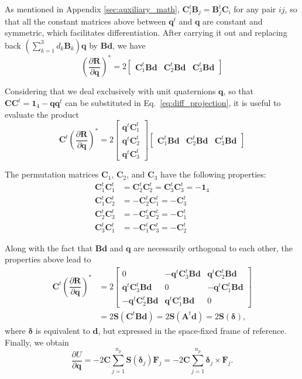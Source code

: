 \documentclass[aip,jcp,reprint,amsmath,amssymb,raggedbottom]{revtex4-1}
\newcommand{\mt}[1]{\boldsymbol{\mathbf{#1}}}           %
\newcommand{\vt}[1]{\boldsymbol{\mathbf{#1}}}           %
\newcommand{\tr}[1]{#1^t}                               %
\newcommand{\diff}[2]{\dfrac{\partial #1}{\partial #2}} %
\begin{document}
As mentioned in Appendix \ref{sec:auxiliary_math}, $\tr{\mt C}_i \mt B_j = \tr{\mt B}_j \mt C_i$ for any pair $ij$, so that all the constant matrices above between $\tr{\vt q}$ and $\vt q$ are constant and symmetric, which facilitates differentiation. After carrying it out and replacing back $(\sum_{k=1}^3 d_k \mt B_k) \vt q$ by $\mt B \vt d$, we have
\[
\left( \diff{\vt R}{\vt q} \right)^\ast = 2 \left[\begin{array}{ccc}
\tr{\mt C}_1 \mt B \vt d & \tr{\mt C}_2 \mt B \vt d & \tr{\mt C}_3 \mt B \vt d
\end{array}\right]
\]

Considering that we deal exclusively with unit quaternions $\vt q$, so that $\mt C \tr{\mt C} = \mt 1_4 - \vt q \tr{\vt q}$ can be substituted in Eq.~\ref{eq:diff_projection}, it is useful to evaluate the product
\[
\tr{\mt C} \left( \diff{\vt R}{\vt q} \right)^\ast = 2 \left[\begin{array}{c}
\tr{\vt q}\tr{\mt C_1} \\
\tr{\vt q}\tr{\mt C_2} \\
\tr{\vt q}\tr{\mt C_3}
\end{array}\right] \left[\begin{array}{ccc}
\tr{\mt C}_1 \mt B \vt d & \tr{\mt C}_2 \mt B \vt d & \tr{\mt C}_3 \mt B \vt d
\end{array}\right]
\]

The permutation matrices $\mt C_1$, $\mt C_2$, and $\mt C_3$ have the following properties:
\begin{equation}
\begin{aligned}
\tr{\mt C_1}\tr{\mt C_1} &= \tr{\mt C_2}\tr{\mt C_2} = \tr{\mt C_3}\tr{\mt C_3} = -\mt 1_4 \\
\tr{\mt C_1}\tr{\mt C_2} &= -\tr{\mt C_2}\tr{\mt C_1} = -\tr{\mt C_3} \\
\tr{\mt C_2}\tr{\mt C_3} &= -\tr{\mt C_3}\tr{\mt C_2} = -\tr{\mt C_1} \\
\tr{\mt C_3}\tr{\mt C_1} &= -\tr{\mt C_1}\tr{\mt C_3} = -\tr{\mt C_2}
\end{aligned}
\end{equation}

Along with the fact that $\mt B\vt d$ and $\vt q$ are necessarily orthogonal to each other, the properties above lead to
\begin{align*}
\tr{\mt C} \left( \diff{\vt R}{\vt q} \right)^\ast &= 2 \left[\begin{array}{ccc}
0 & -\tr{\vt q}\tr{\mt C}_3 \mt B \vt d & \tr{\vt q}\tr{\mt C}_2 \mt B \vt d \\
\tr{\vt q}\tr{\mt C}_3 \mt B \vt d & 0 & -\tr{\vt q}\tr{\mt C}_1 \mt B \vt d \\
-\tr{\vt q}\tr{\mt C}_2 \mt B \vt d & \tr{\vt q}\tr{\mt C}_1 \mt B \vt d & 0
\end{array}\right] \\
&= 2 \mt S(\tr{\mt C} \mt B \vt d) = 2 \mt S(\tr{\mt A}\vt d) = 2 \mt S(\vt \delta),
\end{align*}
where $\vt \delta$ is equivalent to $\vt d$, but expressed in the space-fixed frame of reference. Finally, we obtain
\[
\diff{U}{\vt q} = - 2 \mt C \sum_{j=1}^{n_p} \mt S(\vt \delta_j) {\vt F_j}  = - 2 \mt C \sum_{j=1}^{n_p} \vt \delta_j \times {\vt F_j}.
\]



\end{document}
